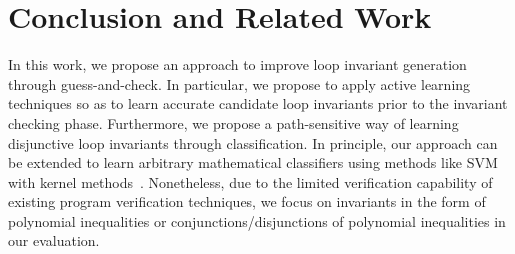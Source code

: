 
\section{Conclusion and Related Work} %
\label{sec:related}
In this work, we propose an approach to improve loop invariant generation through guess-and-check. In particular, we propose to apply active learning techniques so as to learn accurate candidate loop invariants prior to the invariant checking phase. Furthermore, we propose a path-sensitive way of learning disjunctive loop invariants through classification. In principle, our approach can be extended to learn arbitrary mathematical classifiers using methods like SVM with kernel methods~\cite{svm:kernel}.
Nonetheless, due to the limited verification capability of existing program verification techniques, we focus on invariants in the form of polynomial inequalities or conjunctions/disjunctions of polynomial inequalities in our evaluation.



